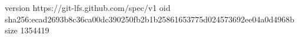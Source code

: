 version https://git-lfs.github.com/spec/v1
oid sha256:ecad2693b8c36ca00dc390250fb2b1b25861653775d024573692ee04a0d4968b
size 1354419
